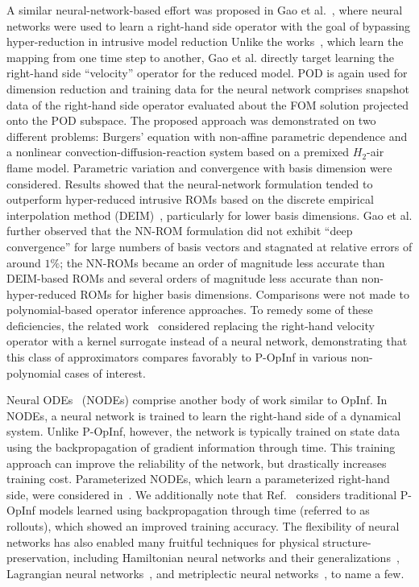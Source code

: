 \documentclass[3p,computermodern,11pt]{elsarticle}
\numberwithin{equation}{section}
\begin{document}
A similar neural-network-based effort was proposed in Gao et al.~\cite{GaWaZh20}, where neural networks were used to learn a right-hand side operator with the goal of bypassing hyper-reduction in intrusive model reduction
Unlike the works~\cite{SaMaAh19,FrDeMa21}, which learn the mapping from one time step to another, Gao et al. directly target learning the right-hand side ``velocity'' operator for the reduced model. POD is again used for dimension reduction and training data for the neural network comprises snapshot data of the right-hand side operator evaluated about the FOM solution projected onto the POD subspace. The proposed approach was demonstrated on two different problems: Burgers' equation with non-affine parametric dependence and a nonlinear convection-diffusion-reaction system based on a premixed $H_2$-air flame model. Parametric variation and convergence with basis dimension were considered. Results showed that the neural-network formulation tended to outperform hyper-reduced intrusive ROMs based on the discrete empirical interpolation method (DEIM)~\cite{ChSo10}, particularly for lower basis dimensions. Gao et al. further observed that the NN-ROM formulation did not exhibit ``deep convergence'' for large numbers of basis vectors and stagnated at relative errors of around $1\%$; the NN-ROMs became an order of magnitude less accurate than DEIM-based ROMs and several orders of magnitude less accurate than non-hyper-reduced ROMs for higher basis dimensions. Comparisons were not made to polynomial-based operator inference approaches. To remedy some of these deficiencies, the related work~\cite{DiNeTe25} considered replacing the right-hand velocity operator with a kernel surrogate instead of a neural network, demonstrating that this class of approximators compares favorably to P-OpInf in various non-polynomial cases of interest.

Neural ODEs~\cite{ChRuBe19} (NODEs) comprise another body of work similar to OpInf. In NODEs, a neural network is trained to learn the right-hand side of a dynamical system. Unlike P-OpInf, however, the network is typically trained on state data using the backpropagation of gradient information through time. This training approach can improve the reliability of the network, but drastically increases training cost. Parameterized NODEs, which learn a parameterized right-hand side, were considered in~\cite{LePa21}. We additionally note that Ref.~\cite{WaHeRa19} considers traditional P-OpInf models learned using backpropagation through time (referred to as rollouts), which showed an improved training accuracy.  The flexibility of neural networks has also enabled many fruitful techniques for physical structure-preservation, including Hamiltonian neural networks and their generalizations~\cite{GrDzYo19,ElGaHu24,DuAlSt24}, Lagrangian neural networks~\cite{CrGrHo20,FiWaWi20}, and metriplectic neural networks~\cite{LeTrSt21,GrLeTr23,GrLeLi25}, to name a few.
\end{document}
